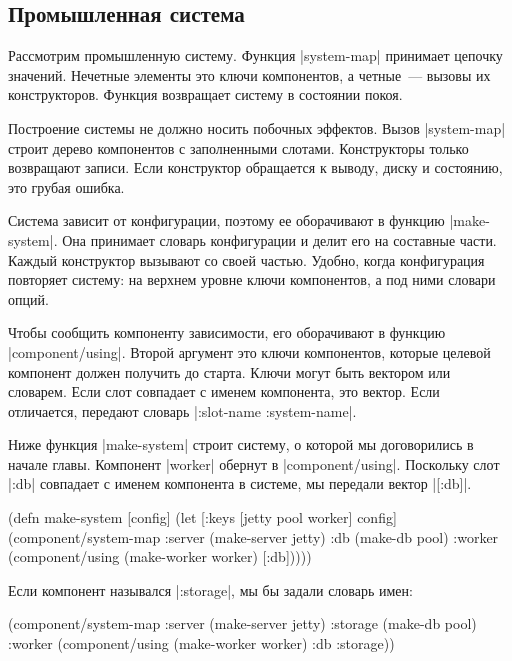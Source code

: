 \subsection{Промышленная система}

Рассмотрим промышленную систему. Функция \spverb|system-map| принимает цепочку
значений. Нечетные элементы это ключи компонентов, а четные~--- вызовы их
конструкторов. Функция возвращает систему в состоянии покоя.

Построение системы не должно носить побочных эффектов. Вызов \spverb|system-map|
строит дерево компонентов с заполненными слотами. Конструкторы только возвращают
записи. Если конструктор обращается к выводу, диску и состоянию, это грубая
ошибка.

Система зависит от конфигурации, поэтому ее оборачивают в функцию
\spverb|make-system|. Она принимает словарь конфигурации и делит его на
составные части. Каждый конструктор вызывают со своей частью. Удобно, когда
конфигурация повторяет систему: на верхнем уровне ключи компонентов, а под ними
словари опций.

Чтобы сообщить компоненту зависимости, его оборачивают в функцию
\spverb|component/using|. Второй аргумент это ключи компонентов, которые целевой
компонент должен получить до старта. Ключи могут быть вектором или
словарем. Если слот совпадает с именем компонента, это вектор. Если отличается,
передают словарь \spverb|{:slot-name :system-name}|.

Ниже функция \spverb|make-system| строит систему, о которой мы договорились в
начале главы. Компонент \spverb|worker| обернут в
\spverb|component/using|. Поскольку слот \spverb|:db| совпадает с именем
компонента в системе, мы передали вектор \spverb|[:db]|.

\begin{english}
  \begin{clojure}
(defn make-system
  [config]
  (let [{:keys [jetty pool worker]} config]
    (component/system-map
     :server (make-server jetty)
     :db     (make-db pool)
     :worker (component/using
              (make-worker worker) [:db]))))
  \end{clojure}
\end{english}

Если компонент назывался \spverb|:storage|, мы бы задали словарь имен:

\begin{english}
  \begin{clojure}
(component/system-map
 :server  (make-server jetty)
 :storage (make-db pool)
 :worker  (component/using
           (make-worker worker) {:db :storage}))
  \end{clojure}
\end{english}

